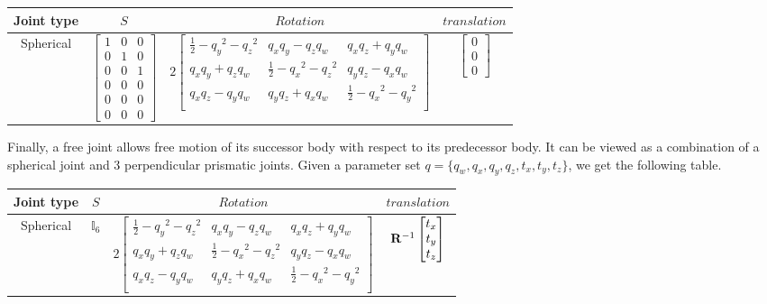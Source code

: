 \begin{table}[ht]
  \centering
  \begin{tabular}{cccc}
    \toprule
    Joint type & $S$ & $Rotation$ & $translation$ \\
    \midrule
    Spherical
    &
    $\begin{bmatrix}
      1 & 0 & 0 \\ 0 & 1 & 0 \\ 0 & 0 & 1 \\ 0 & 0 & 0 \\ 0 & 0 & 0 \\ 0 & 0 & 0
    \end{bmatrix}$
    &
    $2 \begin{bmatrix}
    \frac{1}{2} - {q_y}^2 - {q_z}^2 &	q_x q_y - q_z q_w &	q_x q_z + q_y q_w \\
    q_x q_y + q_z q_w	& \frac{1}{2} - {q_x}^2 - {q_z}^2 &	q_y q_z - q_x q_w \\
    q_x q_z - q_y q_w &	q_y q_z + q_x q_w	& \frac{1}{2} - {q_x}^2 - {q_y}^2 \\
    \end{bmatrix}$
    &
    $\begin{bmatrix}
      0 \\ 0 \\ 0
    \end{bmatrix}$
    \\
    \bottomrule
  \end{tabular}
\end{table}

Finally, a free joint allows free motion of its successor body with respect to its predecessor body.
It can be viewed as a combination of a spherical joint and 3 perpendicular prismatic joints.
Given a parameter set $q = \{ q_w, q_x, q_y, q_z, t_x, t_y, t_z\}$, we get the following table.

\begin{tabular}{cccc}
  \toprule
  Joint type & $S$ & $Rotation$ & $translation$ \\
  \midrule
  Spherical
  &
  $\mathbb{I}_6$
  &
  $2 \begin{bmatrix}
    \frac{1}{2} - {q_y}^2 - {q_z}^2 &	q_x q_y - q_z q_w &	q_x q_z + q_y q_w \\
    q_x q_y + q_z q_w	& \frac{1}{2} - {q_x}^2 - {q_z}^2 &	q_y q_z - q_x q_w \\
    q_x q_z - q_y q_w &	q_y q_z + q_x q_w	& \frac{1}{2} - {q_x}^2 - {q_y}^2 \\
  \end{bmatrix}$
  &
  ${\bf R}^{-1}\begin{bmatrix}
    t_x \\ t_y \\ t_z
  \end{bmatrix}$
  \\
  \bottomrule
\end{tabular}



